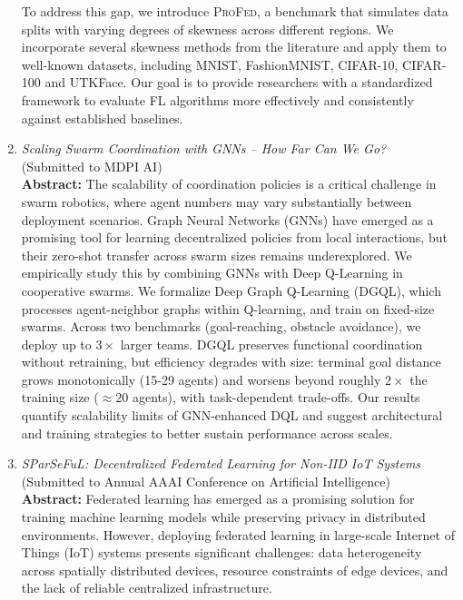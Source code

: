 \documentclass[runningheads]{llncs}
\begin{document}
\begin{enumerate}
    To address this gap, we introduce \textsc{ProFed}, a benchmark that simulates data splits 
     with varying degrees of skewness across different regions. 
    We incorporate several skewness methods from the literature and apply them to 
     well-known datasets, including MNIST, FashionMNIST, CIFAR-10, CIFAR-100 and UTKFace.
    Our goal is to provide researchers with a standardized framework to evaluate FL algorithms 
     more effectively and consistently against established baselines.
    \item \emph{Scaling Swarm Coordination with GNNs -- How Far Can We Go?} \\ (Submitted to MDPI AI) \\
    \textbf{Abstract: }
    The scalability of coordination policies is a critical challenge in swarm robotics, 
     where agent numbers may vary substantially between deployment scenarios. 
    Graph Neural Networks (GNNs) have emerged as a promising tool for learning 
     decentralized policies from local interactions, 
     but their zero-shot transfer across swarm sizes remains underexplored. 
    We empirically study this by combining GNNs with Deep Q-Learning in cooperative swarms.
    We formalize Deep Graph Q-Learning (DGQL), which processes agent-neighbor graphs within Q-learning, 
     and train on fixed-size swarms. Across two benchmarks (goal-reaching, obstacle avoidance), 
     we deploy up to $3\times$ larger teams. 
    DGQL preserves functional coordination without retraining, but efficiency degrades with size: 
     terminal goal distance grows monotonically (15-29 agents) and worsens beyond roughly $2\times$ the training size ($\approx 20$ agents), 
     with task-dependent trade-offs. 
    Our results quantify scalability limits of GNN-enhanced DQL and suggest architectural and training strategies 
     to better sustain performance across scales.
    \item \emph{SParSeFuL: Decentralized Federated Learning for Non-IID IoT Systems} \\ (Submitted to Annual AAAI Conference on Artificial Intelligence) \\
    \textbf{Abstract: }
    Federated learning has emerged as a promising solution for training machine learning models while preserving privacy in distributed environments.
    However, deploying federated learning in large-scale Internet of Things (IoT) systems presents significant challenges: 
     data heterogeneity across spatially distributed devices, resource constraints of edge devices, and the lack of reliable centralized infrastructure.

\end{enumerate}
\end{document}
